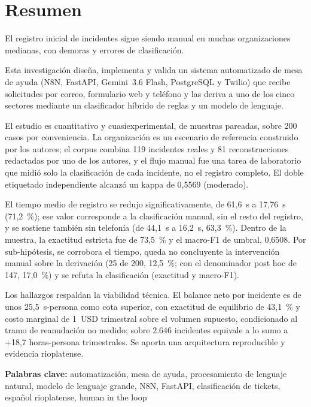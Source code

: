 \newpage
\section*{Resumen}

El registro inicial de incidentes sigue siendo manual en muchas organizaciones medianas, con demoras y errores de clasificación.

Esta investigación diseña, implementa y valida un sistema automatizado de mesa de ayuda (N8N, FastAPI, Gemini~3.6 Flash, PostgreSQL y Twilio) que recibe solicitudes por correo, formulario web y teléfono y las deriva a uno de los cinco sectores mediante un clasificador híbrido de reglas y un modelo de lenguaje.

El estudio es cuantitativo y cuasiexperimental, de muestras pareadas, sobre 200 casos por conveniencia. La organización es un escenario de referencia construido por los autores; el corpus combina 119 incidentes reales y 81 reconstrucciones redactadas por uno de los autores, y el flujo manual fue una tarea de laboratorio que midió solo la clasificación de cada incidente, no el registro completo. El doble etiquetado independiente alcanzó un kappa de 0,5569 (moderado).

El tiempo medio de registro se redujo significativamente, de 61,6~s a 17,76~s (71,2~\%); ese valor corresponde a la clasificación manual, sin el resto del registro, y se sostiene también sin telefonía (de 44,1~s a 16,2~s, 63,3~\%). Dentro de la muestra, la exactitud estricta fue de 73,5~\% y el macro-F1 de umbral, 0,6508. Por sub-hipótesis, se corrobora el tiempo, queda no concluyente la intervención manual sobre la derivación (25 de 200, 12,5~\%; con el denominador post hoc de 147, 17,0~\%) y se refuta la clasificación (exactitud y macro-F1).

Los hallazgos respaldan la viabilidad técnica. El balance neto por incidente es de unos 25,5~s-persona como cota superior, con exactitud de equilibrio de 43,1~\% y costo marginal de 1~USD trimestral sobre el volumen supuesto, condicionado al tramo de reanudación no medido; sobre 2.646 incidentes equivale a lo sumo a +18,7 horas-persona trimestrales. Se aporta una arquitectura reproducible y evidencia rioplatense.

\bigskip
\noindent\textbf{Palabras clave:} automatización, mesa de ayuda, procesamiento de lenguaje natural, modelo de lenguaje grande, N8N, FastAPI, clasificación de tickets, español rioplatense, human in the loop

